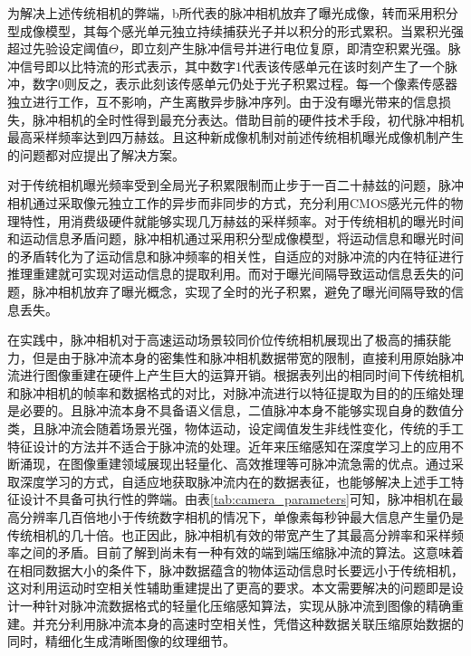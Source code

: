 为解决上述传统相机的弊端，b所代表的脉冲相机放弃了曝光成像，转而采用积分型成像模型，其每个感光单元独立持续捕获光子并以积分的形式累积。当累积光强超过先验设定阈值$\Theta$，即立刻产生脉冲信号并进行电位复原，即清空积累光强。脉冲信号即以比特流的形式表示，其中数字1代表该传感单元在该时刻产生了一个脉冲，数字0则反之，表示此刻该传感单元仍处于光子积累过程。每一个像素传感器独立进行工作，互不影响，产生离散异步脉冲序列。由于没有曝光带来的信息损失，脉冲相机的全时性得到最充分表达。借助目前的硬件技术手段，初代脉冲相机最高采样频率达到四万赫兹\cite{Huang_Tiejun110}。且这种新成像机制对前述传统相机曝光成像机制产生的问题都对应提出了解决方案。

对于传统相机曝光频率受到全局光子积累限制而止步于一百二十赫兹的问题，脉冲相机通过采取像元独立工作的异步而非同步的方式，充分利用CMOS感光元件的物理特性，用消费级硬件就能够实现几万赫兹的采样频率。对于传统相机的曝光时间和运动信息矛盾问题，脉冲相机通过采用积分型成像模型，将运动信息和曝光时间的矛盾转化为了运动信息和脉冲频率的相关性，自适应的对脉冲流的内在特征进行推理重建就可实现对运动信息的提取利用。而对于曝光间隔导致运动信息丢失的问题，脉冲相机放弃了曝光概念，实现了全时的光子积累，避免了曝光间隔导致的信息丢失。

在实践中，脉冲相机对于高速运动场景较同价位传统相机展现出了极高的捕获能力，但是由于脉冲流本身的密集性和脉冲相机数据带宽的限制，直接利用原始脉冲流进行图像重建在硬件上产生巨大的运算开销。根据表列出的相同时间下传统相机和脉冲相机的帧率和数据格式的对比，对脉冲流进行以特征提取为目的的压缩处理是必要的。且脉冲流本身不具备语义信息，二值脉冲本身不能够实现自身的数值分类，且脉冲流会随着场景光强，物体运动，设定阈值发生非线性变化，传统的手工特征设计的方法并不适合于脉冲流的处理。近年来压缩感知在深度学习上的应用不断涌现，在图像重建领域展现出轻量化、高效推理等可脉冲流急需的优点。通过采取深度学习的方式，自适应地获取脉冲流内在的数据表征，也能够解决上述手工特征设计不具备可执行性的弊端。由表\ref{tab:camera_parameters}可知，脉冲相机在最高分辨率几百倍地小于传统数字相机的情况下，单像素每秒钟最大信息产生量仍是传统相机的几十倍。也正因此，脉冲相机有效的带宽产生了其最高分辨率和采样频率之间的矛盾。目前了解到尚未有一种有效的端到端压缩脉冲流的算法。这意味着在相同数据大小的条件下，脉冲数据蕴含的物体运动信息时长要远小于传统相机，这对利用运动时空相关性辅助重建提出了更高的要求。本文需要解决的问题即是设计一种针对脉冲流数据格式的轻量化压缩感知算法，实现从脉冲流到图像的精确重建。并充分利用脉冲流本身的高速时空相关性，凭借这种数据关联压缩原始数据的同时，精细化生成清晰图像的纹理细节。


